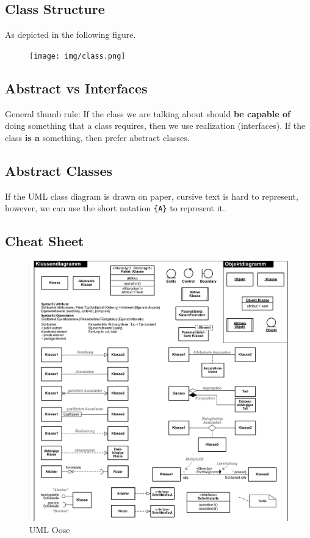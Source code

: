 \documentclass[../main/main.tex]{subfiles}
\begin{document}
\subsection{Class Structure}

As depicted in the following figure. 

\begin{figure}[h!]
  \texttt{[image: img/class.png]}
\end{figure}

\subsection{Abstract vs Interfaces}

General thumb rule: If the class we are talking about should \textbf{be capable
of} doing something that a class requires, then we use realization (interfaces).
If the class \textbf{is a} something, then prefer abstract classes. 


\subsection{Abstract Classes}

If the UML class diagram is drawn on paper, cursive text is hard to represent,
however, we can use the short notation \lstinline|{A}| to represent it.  

\subsection{Cheat Sheet}

\begin{figure}
  \includegraphics{../figures/uml_oose.png}  
  \caption{UML Oose \cite{oose:uml} }
  \label{fig:uml_oose}
\end{figure}
\end{document}
